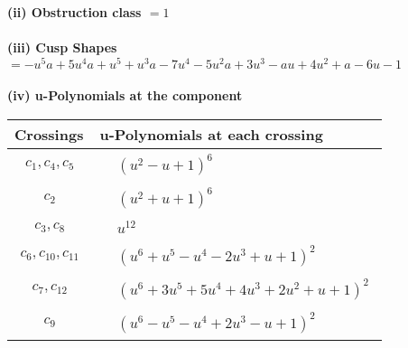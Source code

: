 \documentclass[1p]{elsarticle_modified}
\theoremstyle{definition}
\begin{document}
\flushleft \textbf{(ii) Obstruction class $= 1$}\\~\\
\flushleft \textbf{(iii) Cusp Shapes $= - u^5 a+5 u^4 a+u^5+u^3 a-7 u^4-5 u^2 a+3 u^3- a u+4 u^2+a-6 u-1$}\\~\\
\newpage\renewcommand{\arraystretch}{1}
\flushleft \textbf{(iv) u-Polynomials at the component}\newline \\
\begin{tabular}{m{50pt}|m{274pt}}
Crossings & \hspace{64pt}u-Polynomials at each crossing \\
\hline $$\begin{aligned}c_{1},c_{4},c_{5}\end{aligned}$$&$\begin{aligned}
&(u^2- u+1)^6
\end{aligned}$\\
\hline $$\begin{aligned}c_{2}\end{aligned}$$&$\begin{aligned}
&(u^2+u+1)^6
\end{aligned}$\\
\hline $$\begin{aligned}c_{3},c_{8}\end{aligned}$$&$\begin{aligned}
&u^{12}
\end{aligned}$\\
\hline $$\begin{aligned}c_{6},c_{10},c_{11}\end{aligned}$$&$\begin{aligned}
&(u^6+u^5- u^4-2 u^3+u+1)^2
\end{aligned}$\\
\hline $$\begin{aligned}c_{7},c_{12}\end{aligned}$$&$\begin{aligned}
&(u^6+3 u^5+5 u^4+4 u^3+2 u^2+u+1)^2
\end{aligned}$\\
\hline $$\begin{aligned}c_{9}\end{aligned}$$&$\begin{aligned}
&(u^6- u^5- u^4+2 u^3- u+1)^2
\end{aligned}$\\
\hline
\end{tabular}\\~\\
\end{document}

